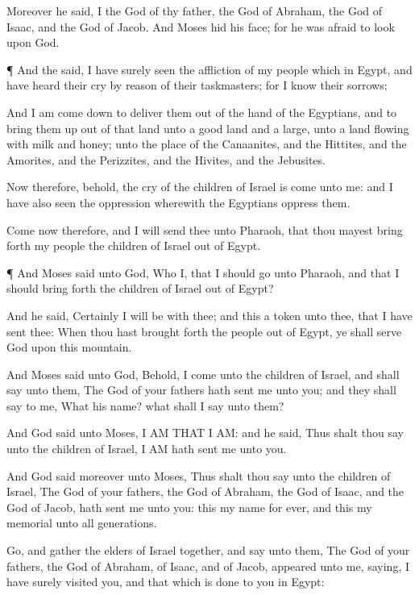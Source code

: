 {Moreover he
said, I
{} the
God of thy
father, the
God of
Abraham, the
God of
Isaac, and the
God of
Jacob. And
Moses
hid his
face; for he was
afraid to
look upon
God.


\par }{\PP {}¶ And the
{}
said, I have
surely
seen the
affliction of my
people which
{} in
Egypt, and have
heard their
cry by
reason of their
taskmasters; for I
know their
sorrows;

And I am come
down to
deliver them out of the
hand of the
Egyptians, and to
bring them up out of that
land unto a
good
land and a
large, unto a
land
flowing with
milk and
honey; unto the
place of the
Canaanites, and the
Hittites, and the
Amorites, and the
Perizzites, and the
Hivites, and the
Jebusites.

Now therefore, behold, the
cry of the
children of
Israel is
come unto me: and I have also
seen the
oppression wherewith the
Egyptians
oppress them.

Come now therefore, and I will
send thee unto
Pharaoh, that thou mayest bring
forth my
people the
children of
Israel out of
Egypt.


\par }{\PP {}¶ And
Moses
said unto
God, Who
{} I, that I should
go unto
Pharaoh, and that I should bring
forth the
children of
Israel out of
Egypt?

And he
said, Certainly I will be with thee; and this
{} a
token unto thee,
that I have
sent thee: When thou hast brought
forth the
people out of
Egypt, ye shall
serve
God upon this
mountain.

And
Moses
said unto
God, Behold,
{} I
come unto the
children of
Israel, and shall
say unto them, The
God of your
fathers hath
sent me unto you; and they shall
say to me, What
{} his
name? what shall I
say unto them?

And
God
said unto
Moses, I
AM THAT I
AM: and he
said, Thus shalt thou
say unto the
children of
Israel, I AM hath
sent me unto you.

And
God
said
moreover unto
Moses, Thus shalt thou
say unto the
children of
Israel, The
{}
God of your
fathers, the
God of
Abraham, the
God of
Isaac, and the
God of
Jacob, hath
sent me unto you: this
{} my
name for
ever, and this
{} my
memorial unto
all
generations.


\par }{\PP {}Go, and
gather the
elders of
Israel
together, and
say unto them, The
{}
God of your
fathers, the
God of
Abraham, of
Isaac, and of
Jacob,
appeared unto me,
saying, I have
surely
visited you, and
{} that which is
done to you in
Egypt:

}
